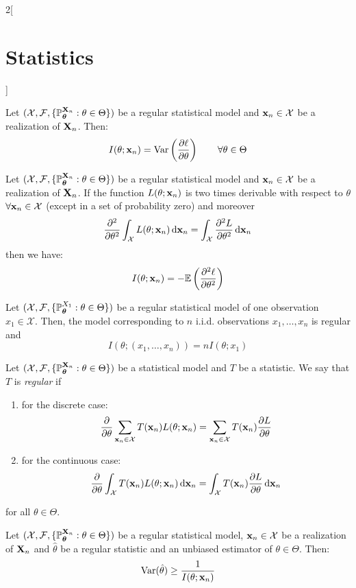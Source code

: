 \documentclass[../../../main.tex]{subfiles}
\begin{document}
\begin{multicols}{2}[\section{Statistics}]
  \begin{corollary}
    Let $(\mathcal{X},\mathcal{F},\{\mathbb{P}_{\boldsymbol{\mathrm{\theta}}}^{\boldsymbol{\mathrm{X}}_n}:\theta\in\Theta\})$ be a regular statistical model and $\boldsymbol{\mathrm{x}}_n\in\mathcal{X}$ be a realization of $\boldsymbol{\mathrm{X}}_n$. Then: $$I(\theta;\boldsymbol{\mathrm{x}}_n)=\operatorname{Var}\left(\pdv{\ell}{\theta}(\theta;\boldsymbol{\mathrm{x}}_n)\right)\qquad\forall\theta\in\Theta$$
  \end{corollary}
  \begin{proposition}
    Let $(\mathcal{X},\mathcal{F},\{\mathbb{P}_{\boldsymbol{\mathrm{\theta}}}^{\boldsymbol{\mathrm{X}}_n}:\theta\in\Theta\})$ be a regular statistical model and $\boldsymbol{\mathrm{x}}_n\in\mathcal{X}$ be a realization of $\boldsymbol{\mathrm{X}}_n$. If the function $L(\theta;\boldsymbol{\mathrm{x}}_n)$ is two times derivable with respect to $\theta$ $\forall \boldsymbol{\mathrm{x}}_n\in\mathcal{X}$ (except in a set of probability zero) and moreover $$\pdv[2]{}{\theta}\int_{\mathcal{X}}L(\theta;\boldsymbol{\mathrm{x}}_n)\dd{\boldsymbol{\mathrm{x}}_n}=\int_{\mathcal{X}}\pdv[2]{L}{\theta}(\theta;\boldsymbol{\mathrm{x}}_n)\dd{\boldsymbol{\mathrm{x}}_n}$$ then we have: $$I(\theta;\boldsymbol{\mathrm{x}}_n)=-\mathbb{E}\left(\pdv[2]{\ell}{\theta}(\theta;\boldsymbol{\mathrm{x}}_n)\right)$$
  \end{proposition}
  \begin{proposition}
    Let $(\mathcal{X},\mathcal{F},\{\mathbb{P}_{\boldsymbol{\mathrm{\theta}}}^{X_1}:\theta\in\Theta\})$ be a regular statistical model of one observation $x_1\in \mathcal{X}$. Then, the model corresponding to $n$ i.i.d. observations $x_1,\ldots,x_n$ is regular and $$I(\theta;(x_1,\ldots,x_n))=n I(\theta;x_1)$$
  \end{proposition}
  \begin{definition}
    Let $(\mathcal{X},\mathcal{F},\{\mathbb{P}_{\boldsymbol{\mathrm{\theta}}}^{\boldsymbol{\mathrm{X}}_n}:\theta\in\Theta\})$ be a statistical model and $T$ be a statistic. We say that $T$ is \emph{regular} if
    \begin{enumerate}
      \item for the discrete case: $$\pdv{}{\theta}\sum_{\boldsymbol{\mathrm{x}}_n\in\mathcal{X}}T(\boldsymbol{\mathrm{x}}_n)L(\theta;\boldsymbol{\mathrm{x}}_n)=\sum_{\boldsymbol{\mathrm{x}}_n\in\mathcal{X}}T(\boldsymbol{\mathrm{x}}_n)\pdv{L}{\theta}(\theta;\boldsymbol{\mathrm{x}}_n)$$
      \item for the continuous case: $$\pdv{}{\theta}\int_{\mathcal{X}}T(\boldsymbol{\mathrm{x}}_n)L(\theta;\boldsymbol{\mathrm{x}}_n)\dd{\boldsymbol{\mathrm{x}}_n}=\int_{\mathcal{X}}T(\boldsymbol{\mathrm{x}}_n)\pdv{L}{\theta}(\theta;\boldsymbol{\mathrm{x}}_n)\dd{\boldsymbol{\mathrm{x}}_n}$$
    \end{enumerate}
    for all $\theta\in\Theta$.
  \end{definition}
  \begin{theorem}
    Let $(\mathcal{X},\mathcal{F},\{\mathbb{P}_{\boldsymbol{\mathrm{\theta}}}^{\boldsymbol{\mathrm{X}}_n}:\theta\in\Theta\})$ be a regular statistical model, $\boldsymbol{\mathrm{x}}_n\in\mathcal{X}$ be a realization of $\boldsymbol{\mathrm{X}}_n$ and $\hat\theta$ be a regular statistic and an unbiased estimator of $\theta\in \Theta$. Then: $$\operatorname{Var}(\hat\theta)\geq \frac{1}{I(\theta;\boldsymbol{\mathrm{x}}_n)}$$

\end{theorem}
\end{multicols}
\end{document}
